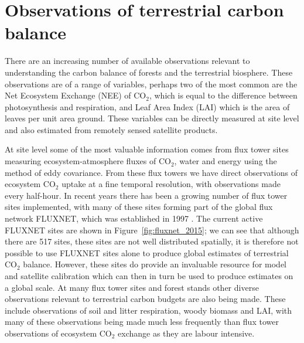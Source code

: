 \documentclass[11pt]{article}
\begin{document}

\section{Observations of terrestrial carbon balance}

There are an increasing number of available observations relevant to understanding the carbon balance of forests and the terrestrial biosphere. These observations are of a range of variables, perhaps two of the most common are the Net Ecosystem Exchange (NEE) of CO\(_{2}\), which is equal to the difference between photosynthesis and respiration, and Leaf Area Index (LAI) which is the area of leaves per unit area ground. These variables can be directly measured at site level and also estimated from remotely sensed satellite products.

At site level some of the most valuable information comes from flux tower sites measuring ecosystem-atmosphere fluxes of CO\(_{2}\), water and energy using the method of eddy covariance. From these flux towers we have direct observations of ecosystem CO\(_{2}\) uptake at a fine temporal resolution, with observations made every half-hour. In recent years there has been a growing number of flux tower sites implemented, with many of these sites forming part of the global flux network FLUXNET, which was established in 1997 \citep{baldocchi2001fluxnet}. The current active FLUXNET sites are shown in Figure~\ref{fig:fluxnet_2015}; we can see that although there are 517 sites, these sites are not well distributed spatially, it is therefore not possible to use FLUXNET sites alone to produce global estimates of terrestrial CO\(_{2}\) balance. However, these sites do provide an invaluable resource for model and satellite calibration which can then in turn be used to produce estimates on a global scale. At many flux tower sites and forest stands other diverse observations relevant to terrestrial carbon budgets are also being made. These include observations of soil and litter respiration, woody biomass and LAI, with many of these observations being made much less frequently than flux tower observations of ecosystem CO\(_{2}\) exchange as they are labour intensive.     
\end{document}
